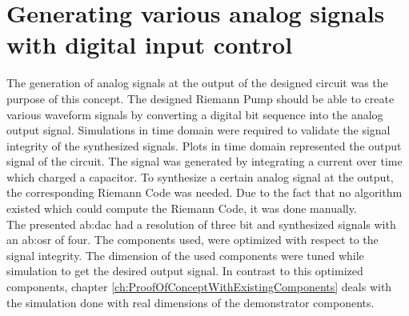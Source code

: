 \section{Generating various analog signals with digital input control}
The generation of analog signals at the output of the designed circuit was the purpose of this concept.
 The designed Riemann Pump should be able to create various waveform signals by converting a digital bit sequence into the analog output signal.
Simulations in time domain were required to validate the signal integrity of the synthesized signals.
Plots in time domain represented the output signal of the circuit.
The signal was generated by integrating a current over time which charged a capacitor.
To synthesize a certain analog signal at the output, the corresponding Riemann Code was needed.
Due to the fact that no algorithm existed which could compute the Riemann Code, it was done manually.\\ 
 The presented \gls{ab:dac} had a resolution of three bit and synthesized signals with an \gls{ab:osr} of four. 
  The components used, were optimized with respect to the signal integrity. 
  The dimension of the used components were tuned while simulation to get the desired output signal.
  In contrast to this optimized components, chapter \ref{ch:ProofOfConceptWithExistingComponents} deals with the simulation done with real dimensions of the demonstrator components. 
 
